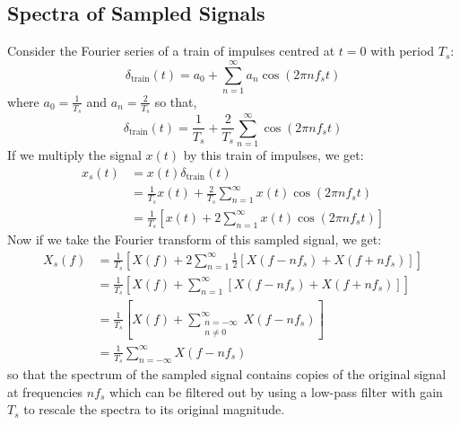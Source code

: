 \documentclass{article}
\begin{document}
\subsection{Spectra of Sampled Signals}
Consider the Fourier series of a train of impulses centred at \(t = 0\)
with period \(T_s\):
\begin{equation*}
    \delta_{\mathrm{train}}\left( t \right) = a_0 + \sum_{n = 1}^{\infty} a_n \cos\left( 2\pi n f_s t \right)
\end{equation*}
where \(a_0 = \frac{1}{T_s}\) and \(a_n = \frac{2}{T_s}\) so that,
\begin{equation*}
    \delta_{\mathrm{train}}\left( t \right) = \frac{1}{T_s} + \frac{2}{T_s} \sum_{n = 1}^{\infty} \cos\left( 2\pi n f_s t \right)
\end{equation*}
If we multiply the signal \(x\left( t \right)\) by this train of impulses, we get:
\begin{align*}
    x_s\left( t \right) & = x\left( t \right) \delta_{\mathrm{train}}\left( t \right)                                                                  \\
                        & = \frac{1}{T_s} x\left( t \right) + \frac{2}{T_s} \sum_{n = 1}^{\infty} x\left( t \right) \cos\left( 2\pi n f_s t \right)    \\
                        & = \frac{1}{T_s} \left[ x\left( t \right) + 2 \sum_{n = 1}^{\infty} x\left( t \right) \cos\left( 2\pi n f_s t \right) \right]
\end{align*}
Now if we take the Fourier transform of this sampled signal, we get:
\begin{align*}
    X_s\left( f \right) & = \frac{1}{T_s} \left[ X\left( f \right) + 2 \sum_{n = 1}^\infty \frac{1}{2}\left[ X\left( f - nf_s \right) + X\left( f + nf_s \right) \right] \right] \\
                        & = \frac{1}{T_s} \left[ X\left( f \right) + \sum_{n = 1}^\infty \left[ X\left( f - nf_s \right) + X\left( f + nf_s \right) \right] \right]              \\
                        & = \frac{1}{T_s} \left[ X\left( f \right) + \sum_{\substack{n = -\infty                                                                                 \\ n \neq 0}}^\infty X\left( f - nf_s \right) \right]              \\
                        & = \frac{1}{T_s} \sum_{n = -\infty}^\infty X\left( f - nf_s \right)
\end{align*}
so that the spectrum of the sampled signal contains copies of the
original signal at frequencies \(n f_s\) which can be filtered out by
using a low-pass filter with gain \(T_s\) to rescale the spectra to its
original magnitude.
\end{document}
